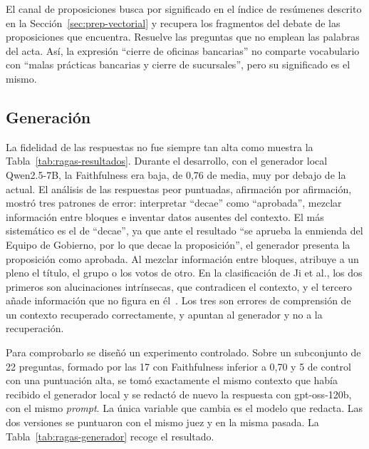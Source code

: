 \documentclass[11pt, a4paper]{report}
\begin{document}
	El canal de proposiciones busca por significado en el
	índice de resúmenes descrito en la Sección~\ref{sec:prep-vectorial} y recupera
	los fragmentos del debate de las proposiciones que encuentra. Resuelve las
	preguntas que no emplean las palabras del acta. Así, la expresión ``cierre de
	oficinas bancarias'' no comparte vocabulario con ``malas prácticas bancarias y
	cierre de sucursales'', pero su significado es el mismo.

		\subsection{Generación}
	\label{sec:analisis-generacion}

	La fidelidad de las respuestas no fue siempre tan alta como muestra la
	Tabla~\ref{tab:ragas-resultados}. Durante el desarrollo, con el generador
	local Qwen2.5-7B, la Faithfulness era baja, de 0,76 de media, muy por debajo
	de la actual. El análisis de las
	respuestas peor puntuadas, afirmación por afirmación, mostró tres patrones de
	error: interpretar ``decae'' como ``aprobada'', mezclar información entre
	bloques e inventar datos ausentes del contexto. El más sistemático es el de
	``decae'', ya que ante el resultado ``se aprueba la enmienda del Equipo de
	Gobierno, por lo que decae la proposición'', el generador presenta la
	proposición como aprobada. Al mezclar información entre bloques, atribuye a
	un pleno el título, el grupo o los votos de otro. En la clasificación
	de Ji et al., los dos primeros son alucinaciones intrínsecas, que contradicen
	el contexto, y el tercero añade información que no figura en
	él~\cite{ji2023-hallucination}. Los tres
	son errores de comprensión de un contexto recuperado correctamente, y apuntan
	al generador y no a la recuperación.

	Para comprobarlo se diseñó un experimento controlado. Sobre un subconjunto de
	22 preguntas, formado por las 17 con Faithfulness inferior a 0,70 y 5 de
	control con una puntuación alta, se tomó exactamente el mismo contexto que
	había recibido el generador local y se redactó de nuevo la respuesta con
	gpt-oss-120b, con el mismo \textit{prompt}. La única variable que cambia es el
	modelo que redacta. Las dos versiones se puntuaron con el mismo juez y en la
	misma pasada. La Tabla~\ref{tab:ragas-generador} recoge el resultado.
\end{document}
